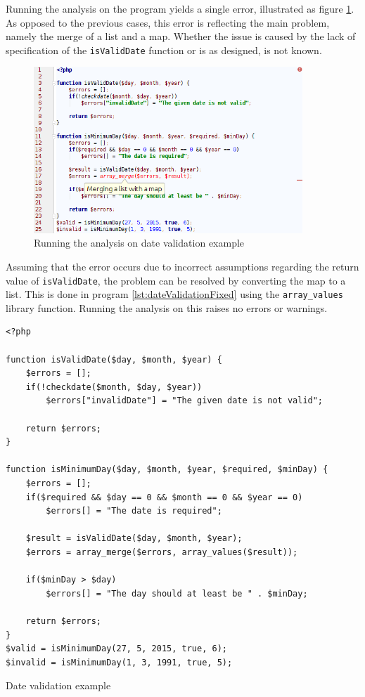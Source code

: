 Running the analysis on the program yields a single error, illustrated as figure \ref{fig:dateScreenshot}. As opposed to the previous cases, this error is reflecting the main problem, namely the merge of a list and a map. Whether the issue is caused by the lack of specification of the \texttt{isValidDate} function or is as designed, is not known.

\begin{figure}
\centering
\includegraphics[width=0.9\textwidth]{chapters/caseStudy/screens/date}
\caption{Running the analysis on date validation example}
\label{fig:dateScreenshot}
\end{figure}


Assuming that the error occurs due to incorrect assumptions regarding the return value of \texttt{isValidDate}, the problem can be resolved by converting the map to a list. This is done in program \ref{lst:dateValidationFixed} using the \texttt{array\_values} library function. Running the analysis on this raises no errors or warnings.


\begin{program}
\begin{lstlisting}
<?php

function isValidDate($day, $month, $year) {
    $errors = [];
    if(!checkdate($month, $day, $year))
        $errors["invalidDate"] = "The given date is not valid";

    return $errors;
}

function isMinimumDay($day, $month, $year, $required, $minDay) {
    $errors = [];
    if($required && $day == 0 && $month == 0 && $year == 0)
        $errors[] = "The date is required";

    $result = isValidDate($day, $month, $year);
    $errors = array_merge($errors, array_values($result));

    if($minDay > $day)
        $errors[] = "The day should at least be " . $minDay;

    return $errors;
}
$valid = isMinimumDay(27, 5, 2015, true, 6);
$invalid = isMinimumDay(1, 3, 1991, true, 5);
\end{lstlisting}
\caption{Date validation example}
\label{lst:dateValidationFixed}
\end{program}